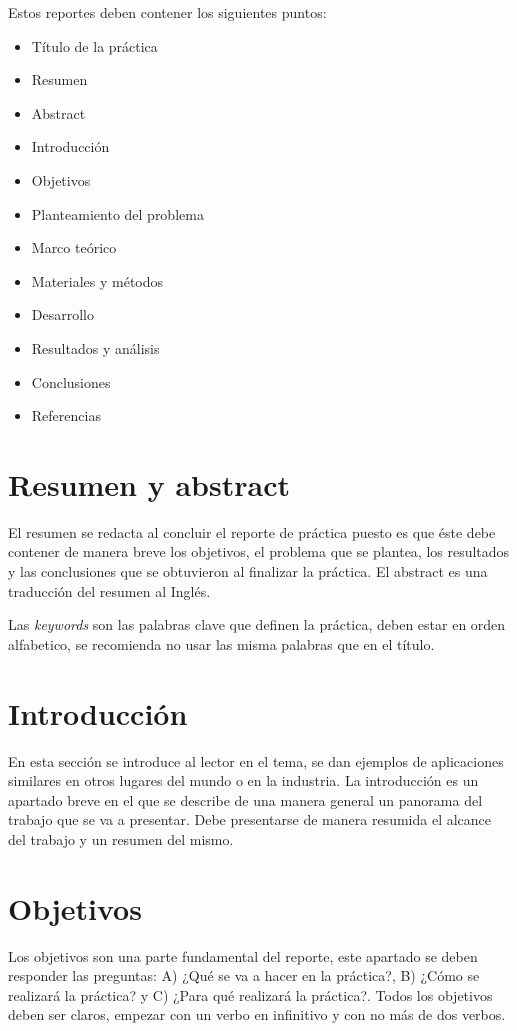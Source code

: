 \documentclass[times,5p, twocolumn]{elsarticle}
\begin{document}
Estos reportes deben contener los siguientes puntos:
\begin{itemize}
 \item Título de la práctica
 \item Resumen
 \item Abstract
 \item Introducción
 \item Objetivos
 \item Planteamiento del problema
 \item Marco teórico
 \item Materiales y métodos
 \item Desarrollo
 \item Resultados y análisis
 \item Conclusiones
 \item Referencias
\end{itemize} 

\section{Resumen y abstract}
El resumen se redacta al concluir el reporte de práctica puesto es que éste debe contener de manera breve los objetivos, el problema que se plantea, los resultados y las conclusiones que se obtuvieron al finalizar la práctica. El abstract es una traducción del resumen al Inglés.

Las \textit{keywords} son las palabras clave que definen la práctica, deben estar en orden alfabetico, se recomienda no usar las misma palabras que en el título.

\section{Introducción}
En esta sección se introduce al lector en el tema, se dan ejemplos de aplicaciones similares en otros lugares del mundo o en la industria. La introducción es un apartado breve en el que se describe de una manera general un panorama del trabajo que se va a presentar. Debe presentarse de manera resumida el alcance del trabajo y un resumen del mismo.

\section{Objetivos}
Los objetivos son una parte fundamental del reporte, este apartado se deben responder las preguntas: A) ¿Qué se va a hacer en la práctica?, B) ¿Cómo se realizará la práctica? y C) ¿Para qué realizará la práctica?. Todos los objetivos deben ser claros, empezar con un verbo en infinitivo y con no más de dos verbos.
\end{document}
